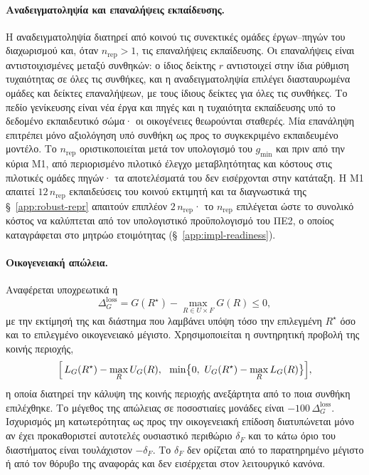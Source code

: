 \documentclass[11pt,a4paper]{article}
\begin{document}
\paragraph{Αναδειγματοληψία και επαναλήψεις εκπαίδευσης.}
Η αναδειγματοληψία διατηρεί από κοινού τις συνεκτικές ομάδες έργων--πηγών του διαχωρισμού και, όταν \(n_{\mathrm{rep}}>1\), τις επαναλήψεις εκπαίδευσης. Οι επαναλήψεις είναι αντιστοιχισμένες μεταξύ συνθηκών: ο ίδιος δείκτης \(r\) αντιστοιχεί στην ίδια ρύθμιση τυχαιότητας σε όλες τις συνθήκες, και η αναδειγματοληψία επιλέγει διασταυρωμένα ομάδες και δείκτες επαναλήψεων, με τους ίδιους δείκτες για όλες τις συνθήκες. Το πεδίο γενίκευσης είναι νέα έργα και πηγές και η τυχαιότητα εκπαίδευσης υπό το δεδομένο εκπαιδευτικό σώμα· οι οικογένειες θεωρούνται σταθερές. Μία επανάληψη επιτρέπει μόνο αξιολόγηση υπό συνθήκη ως προς το συγκεκριμένο εκπαιδευμένο μοντέλο. Το \(n_{\mathrm{rep}}\) οριστικοποιείται μετά τον υπολογισμό του \(g_{\min}\) και πριν από την κύρια M1, από περιορισμένο πιλοτικό έλεγχο μεταβλητότητας και κόστους στις πιλοτικές ομάδες πηγών· τα αποτελέσματά του δεν εισέρχονται στην κατάταξη. Η M1 απαιτεί \(12\,n_{\mathrm{rep}}\) εκπαιδεύσεις του κοινού εκτιμητή και τα διαγνωστικά της §~\ref{app:robust-repr} απαιτούν επιπλέον \(2\,n_{\mathrm{rep}}\)· το \(n_{\mathrm{rep}}\) επιλέγεται ώστε το συνολικό κόστος να καλύπτεται από τον υπολογιστικό προϋπολογισμό του ΠΕ2, ο οποίος καταγράφεται στο μητρώο ετοιμότητας (§~\ref{app:impl-readiness}).

\paragraph{Οικογενειακή απώλεια.}
Αναφέρεται υποχρεωτικά η
\[
\Delta_G^{\mathrm{loss}}=G(R^\star)-\max_{R\in U\times F}G(R)\leq0,
\]
με την εκτίμησή της και διάστημα που λαμβάνει υπόψη τόσο την επιλεγμένη \(R^\star\) όσο και το επιλεγμένο οικογενειακό μέγιστο. Χρησιμοποιείται η συντηρητική προβολή της κοινής περιοχής,
\[
\Bigl[\,L_G(R^\star)-\max_{R}U_G(R),\ \ \min\bigl\{0,\ U_G(R^\star)-\max_{R}L_G(R)\bigr\}\Bigr],
\]
η οποία διατηρεί την κάλυψη της κοινής περιοχής ανεξάρτητα από το ποια συνθήκη επιλέχθηκε. Το μέγεθος της απώλειας σε ποσοστιαίες μονάδες είναι \(-100\,\Delta_G^{\mathrm{loss}}\). Ισχυρισμός μη κατωτερότητας ως προς την οικογενειακή επίδοση διατυπώνεται μόνο αν έχει προκαθοριστεί αυτοτελές ουσιαστικό περιθώριο \(\delta_F\) και το κάτω όριο του διαστήματος είναι τουλάχιστον \(-\delta_F\). Το \(\delta_F\) δεν ορίζεται από το παρατηρημένο μέγιστο ή από τον θόρυβο της αναφοράς και δεν εισέρχεται στον λειτουργικό κανόνα.
\end{document}
